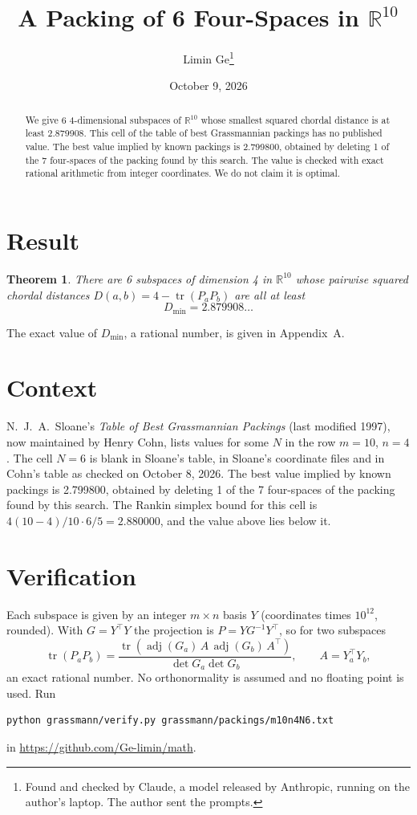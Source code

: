 \documentclass[11pt,a4paper]{article}
\title{A Packing of 6 Four-Spaces in $\mathbb{R}^{10}$}
\author{Limin Ge\thanks{Found and checked by Claude, a model released by Anthropic, running on the author's laptop. The author sent the prompts.}}
\date{October 9, 2026}
\newtheorem*{theorem}{Theorem}
\begin{document}
\maketitle
\begin{abstract}
We give 6 4-dimensional subspaces of $\mathbb{R}^{10}$ whose smallest squared chordal distance is at least 2.879908. This cell of the table of best Grassmannian packings has no published value. The best value implied by known packings is 2.799800, obtained by deleting 1 of the 7 four-spaces of the packing found by this search. The value is checked with exact rational arithmetic from integer coordinates. We do not claim it is optimal.
\end{abstract}

\section{Result}
\begin{theorem}
There are 6 subspaces of dimension 4 in $\mathbb{R}^{10}$ whose pairwise squared chordal distances $D(a,b) = 4 - \operatorname{tr}(P_aP_b)$ are all at least
\[ D_{\min} = 2.879908\ldots \]
\end{theorem}
The exact value of $D_{\min}$, a rational number, is given in Appendix~A.


\section{Context}
N.~J.~A.~Sloane's \emph{Table of Best Grassmannian Packings} (last modified 1997), now maintained by Henry Cohn, lists values for some $N$ in the row $m=10$, $n=4$. The cell $N=6$ is blank in Sloane's table, in Sloane's coordinate files and in Cohn's table as checked on October 8, 2026. The best value implied by known packings is 2.799800, obtained by deleting 1 of the 7 four-spaces of the packing found by this search. The Rankin simplex bound for this cell is $4(10-4)/10\cdot 6/5 = 2.880000$, and the value above lies below it.


\section{Verification}
Each subspace is given by an integer $m\times n$ basis $Y$ (coordinates times $10^{12}$, rounded). With $G=Y^\top Y$ the projection is $P=YG^{-1}Y^\top$, so for two subspaces
\[ \operatorname{tr}(P_aP_b)=\frac{\operatorname{tr}(\operatorname{adj}(G_a)\,A\,\operatorname{adj}(G_b)\,A^\top)}{\det G_a\det G_b},\qquad A=Y_a^\top Y_b, \]
an exact rational number. No orthonormality is assumed and no floating point is used. Run
\begin{verbatim}
python grassmann/verify.py grassmann/packings/m10n4N6.txt
\end{verbatim}
in \url{https://github.com/Ge-limin/math}.
\end{document}
